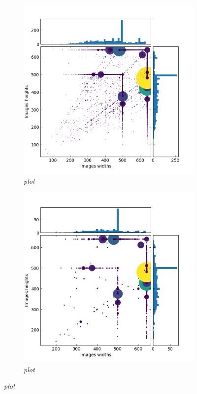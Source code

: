 \documentclass{article}
\begin{document}
        \begin{figure}[!ht]
            \begin{subfigure}{.49\linewidth}
                \centering
                \includegraphics[width=\linewidth]{pics/train2017full.png}
                \caption{\textit{plot}}
            \end{subfigure}
            \begin{subfigure}{.49\linewidth}
                \centering
                \includegraphics[width=\linewidth]{pics/val2017full.png}
                \caption{\textit{plot}}
            \end{subfigure}


\end{figure}
\end{document}
